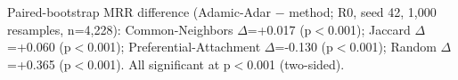 \noindent\footnotesize Paired-bootstrap MRR difference (Adamic-Adar $-$ method; R0, seed 42, 1,000 resamples, n=4,228): Common-Neighbors $\Delta$=+0.017 (p$<$0.001); Jaccard $\Delta$=+0.060 (p$<$0.001); Preferential-Attachment $\Delta$=-0.130 (p$<$0.001); Random $\Delta$=+0.365 (p$<$0.001). All significant at p$<$0.001 (two-sided).\normalsize

